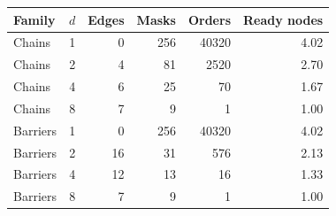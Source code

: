 \begin{tabular}{lrrrrr}
\toprule
Family & $d$ & Edges & Masks & Orders & Ready nodes\\
\midrule
Chains & 1 & 0 & 256 & 40320 & 4.02\\
Chains & 2 & 4 & 81 & 2520 & 2.70\\
Chains & 4 & 6 & 25 & 70 & 1.67\\
Chains & 8 & 7 & 9 & 1 & 1.00\\
Barriers & 1 & 0 & 256 & 40320 & 4.02\\
Barriers & 2 & 16 & 31 & 576 & 2.13\\
Barriers & 4 & 12 & 13 & 16 & 1.33\\
Barriers & 8 & 7 & 9 & 1 & 1.00\\
\bottomrule
\end{tabular}